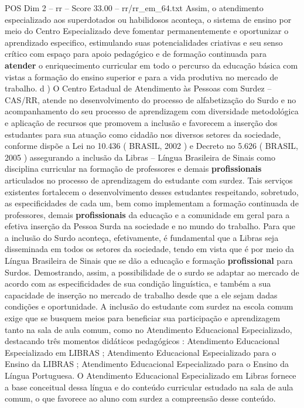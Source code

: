\begin{textsample}{POS Dim 2 – rr – Score 33.00 – rr/rr\_em\_64.txt}
Assim, o atendimento especializado aos superdotados ou habilidosos aconteça, o sistema de ensino por meio do Centro Especializado deve fomentar permanentemente e oportunizar o aprendizado especifico, estimulando suas potencialidades criativas e seu senso crítico com espaço para apoio pedagógico e de formação continuada para \textbf{atender} o enriquecimento curricular em todo o percurso da educação básica com vistas a formação do ensino superior e para a vida produtiva no mercado de trabalho. d ) O Centro Estadual de Atendimento às Pessoas com Surdez – CAS/RR, atende no desenvolvimento do processo de alfabetização do Surdo e no acompanhamento do seu processo de aprendizagem com diversidade metodológica e aplicação de recursos que promovem a inclusão e favorecem a inserção dos estudantes para sua atuação como cidadão nos diversos setores da sociedade, conforme dispõe a Lei no 10.436 ( BRASIL, 2002 ) e Decreto no 5.626 ( BRASIL, 2005 ) assegurando a inclusão da Libras – Língua Brasileira de Sinais como disciplina curricular na formação de professores e demais \textbf{profissionais} articulados no processo de aprendizagem do estudante com surdez.
Tais serviços existentes fortalecem o desenvolvimento desses estudantes respeitando, sobretudo, as especificidades de cada um, bem como implementam a formação continuada de professores, demais \textbf{profissionais} da educação e a comunidade em geral para a efetiva inserção da Pessoa Surda na sociedade e no mundo do trabalho.
Para que a inclusão do Surdo aconteça, efetivamente, é fundamental que a Libras seja disseminada em todos os setores da sociedade, tendo em vista que é por meio da Língua Brasileira de Sinais que se dão a educação e formação \textbf{profissional} para Surdos.
Demostrando, assim, a possibilidade de o surdo se adaptar ao mercado de acordo com as especificidades de sua condição linguística, e também a sua capacidade de inserção no mercado de trabalho desde que a ele sejam dadas condições e oportunidade.
A inclusão do estudante com surdez na escola comum exige que se busquem meios para beneficiar sua participação e aprendizagem tanto na sala de aula comum, como no Atendimento Educacional Especializado, destacando três momentos didáticos pedagógicos : Atendimento Educacional Especializado em LIBRAS ; Atendimento Educacional Especializado para o Ensino da LIBRAS ; Atendimento Educacional Especializado para o Ensino da Língua Portuguesa.
O Atendimento Educacional Especializado em Libras fornece a base conceitual dessa língua e do conteúdo curricular estudado na sala de aula comum, o que favorece ao aluno com surdez a compreensão desse conteúdo.

\end{textsample}
